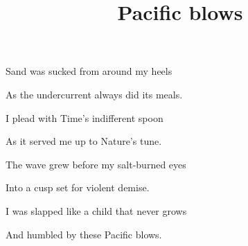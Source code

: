 \documentclass{article}
\title{Pacific blows}
\begin{document}
 \newline

Sand was sucked from around my heels\newline

As the undercurrent always did its meals.\newline

I plead with Time's indifferent spoon\newline

As it served me up to Nature's tune.\newline \newline

The wave grew before my salt-burned eyes\newline

Into a cusp set for violent demise.\newline

I was slapped like a child that never grows\newline

And humbled by these Pacific blows.\newline
\end{document}
